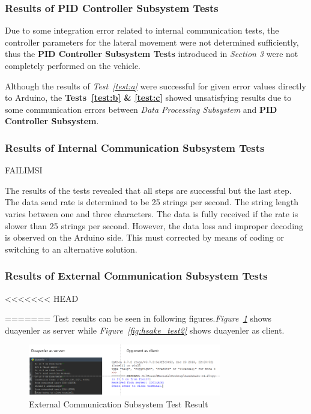 \documentclass[a4paper,12pt]{article}
\begin{document}
		
	\subsubsection*{Results of PID Controller Subsystem Tests}
	
	Due to some integration error related to internal communication tests, the controller parameters for the lateral movement were not determined sufficiently, thus the \textbf{PID Controller Subsystem Tests} introduced in \textit{Section 3} were not completely performed on the vehicle. 
	
	Although the results of \textit{Test~\ref{test:a}} were successful for given error values directly to Arduino, the \textbf{Tests~\ref{test:b} \& \ref{test:c}} showed unsatisfying results due to some communication errors between \textit{Data Processing Subsystem} and \textbf{PID Controller Subsystem}.
	
	
	\subsubsection*{Results of Internal Communication Subsystem Tests}
	
	
	 FAILIMSI
	
	
	The results of the tests revealed that all steps are successful but the last step. The data send rate is determined to be 25 strings per second. The string length varies between one and three characters. The data is fully received if the rate is slower than 25 strings per second. However, the data loss  and  improper decoding is observed on the Arduino side. This must corrected by means of coding or switching to an alternative solution.
	

	
	
	
		

	\subsubsection*{Results of External Communication Subsystem Tests}
	
<<<<<<< HEAD
	
=======
	 Test results can be seen in following figures.\textit{Figure~\ref{fig:hsake_test1}} shows duayenler as server while \textit{Figure~\ref{fig:hsake_test2}} shows duayenler as client.
	
	\begin{figure}[h]
		\includegraphics[width=0.75\textwidth,center]{images/hsake1}
		\caption{External Communication Subsystem Test Result \label{fig:hsake_test1} }
	\end{figure}
	
\end{document}
